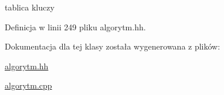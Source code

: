 tablica kluczy 



Definicja w linii 249 pliku algorytm.\-hh.



Dokumentacja dla tej klasy została wygenerowana z plików\-:\begin{DoxyCompactItemize}
\item 
\hyperlink{algorytm_8hh}{algorytm.\-hh}\item 
\hyperlink{algorytm_8cpp}{algorytm.\-cpp}\end{DoxyCompactItemize}
